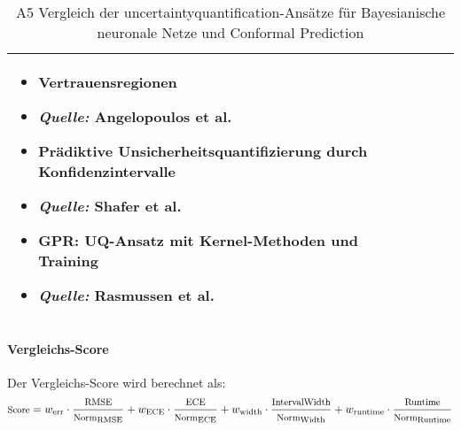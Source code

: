 \begin{otherlanguage}{ngerman}
\begin{table}[!htpb]
\begin{tabularx}{\textwidth}{|>{\centering\arraybackslash}l|X|X|}
    \begin{minipage}[t]{\linewidth}
    \vspace{0.3em}
    \begin{itemize}[leftmargin=*, label={}, itemsep=0.2em, topsep=0em, parsep=0em]
      \item Vertrauensregionen
      \item \begin{scriptsize}\textit{Quelle:} Angelopoulos et al. \parencite{angelopoulos2021gentle}\end{scriptsize}
      \item Prädiktive Unsicherheitsquantifizierung durch Konfidenzintervalle
      \item \begin{scriptsize}\textit{Quelle:} Shafer et al. \parencite[S.~63–65]{shafer2008tutorial}\end{scriptsize}
      \item GPR: UQ-Ansatz mit Kernel-Methoden und Training
      \item \begin{scriptsize}\textit{Quelle:} Rasmussen et al. \parencite{rasmussen2006gaussian}\end{scriptsize}
    \end{itemize}
    \vspace{0.3em}
    \end{minipage} \\
    \hline

  \end{tabularx}
  \caption{A5 Vergleich der \gls{uncertaintyquantification}-Ansätze für \gls{Bayesianische neuronale Netze} und \gls{Conformal Prediction}}
  \label{tab:chapter6r81}
\end{table}



\paragraph{Vergleichs-Score}

Der Vergleichs-Score wird berechnet als:
{
  \[\footnotesize
  \text{Score} = w_\text{err} \cdot \frac{\text{RMSE}}{\text{Norm}_\text{RMSE}}
  + w_\text{ECE} \cdot \frac{\text{ECE}}{\text{Norm}_\text{ECE}}
  + w_\text{width} \cdot \frac{\text{IntervalWidth}}{\text{Norm}_\text{Width}}
  + w_\text{runtime} \cdot \frac{\text{Runtime}}{\text{Norm}_\text{Runtime}}
  \]
}


\end{otherlanguage}
